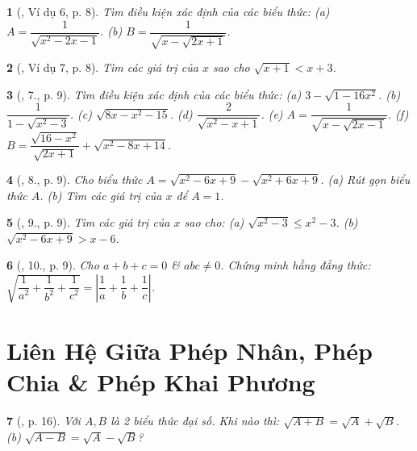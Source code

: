 \documentclass{article}
\newtheorem{baitoan}{}%
\begin{document}
\begin{baitoan}[\cite{Binh_Toan_9_tap_1}, Ví dụ 6, p. 8]
	Tìm điều kiện xác định của các biểu thức: (a) $A = \dfrac{1}{\sqrt{x^2 - 2x - 1}}$. (b) $B = \dfrac{1}{\sqrt{x - \sqrt{2x + 1}}}$.
\end{baitoan}

\begin{baitoan}[\cite{Binh_Toan_9_tap_1}, Ví dụ 7, p. 8]
	Tìm các giá trị của $x$ sao cho $\sqrt{x + 1} < x + 3$.
\end{baitoan}

\begin{baitoan}[\cite{Binh_Toan_9_tap_1}, 7., p. 9]
	Tìm điều kiện xác định của các biểu thức: (a) $3 - \sqrt{1 - 16x^2}$. (b) $\dfrac{1}{1 - \sqrt{x^2 - 3}}$. (c) $\sqrt{8x - x^2 - 15}$. (d) $\dfrac{2}{\sqrt{x^2 - x + 1}}$. (e) $A = \dfrac{1}{\sqrt{x - \sqrt{2x - 1}}}$. (f) $B = \dfrac{\sqrt{16 - x^2}}{\sqrt{2x + 1}} + \sqrt{x^2 - 8x + 14}$.
\end{baitoan}

\begin{baitoan}[\cite{Binh_Toan_9_tap_1}, 8., p. 9]
	Cho biểu thức $A = \sqrt{x^2 - 6x + 9} - \sqrt{x^2 + 6x + 9}$. (a) Rút gọn biểu thức $A$. (b) Tìm các giá trị của $x$ để $A = 1$.
\end{baitoan}

\begin{baitoan}[\cite{Binh_Toan_9_tap_1}, 9., p. 9]
	Tìm các giá trị của $x$ sao cho: (a) $\sqrt{x^2 - 3}\le x^2 - 3$. (b) $\sqrt{x^2 - 6x + 9} > x - 6$.
\end{baitoan}

\begin{baitoan}[\cite{Binh_Toan_9_tap_1}, 10., p. 9]
	Cho $a + b + c = 0$ \& $abc\ne0$. Chứng minh hằng đẳng thức: $\sqrt{\dfrac{1}{a^2} + \dfrac{1}{b^2} + \dfrac{1}{c^2}} = \left|\dfrac{1}{a} + \dfrac{1}{b} + \dfrac{1}{c}\right|$.
\end{baitoan}


\section{Liên Hệ Giữa Phép Nhân, Phép Chia \& Phép Khai Phương}

\begin{baitoan}[\cite{Binh_boi_duong_Toan_9_tap_1}, p. 16]
	Với $A,B$ là 2 biểu thức đại số. Khi nào thì: $\sqrt{A + B} = \sqrt{A} + \sqrt{B}$. (b) $\sqrt{A - B} = \sqrt{A} - \sqrt{B}$?
\end{baitoan}
\end{document}

